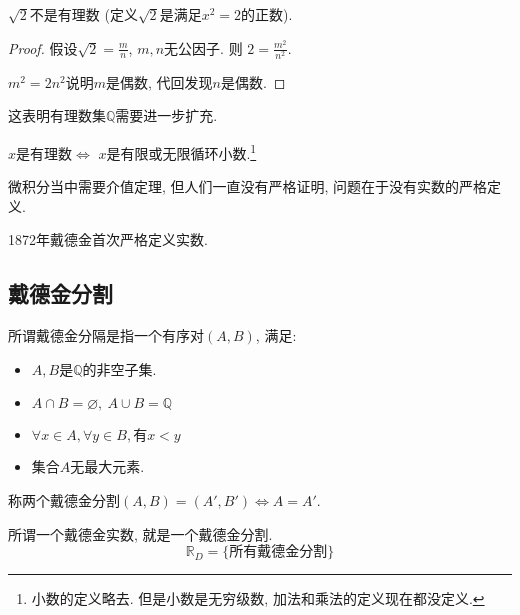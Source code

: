 \begin{proposition}
    $\sqrt{2}$不是有理数 (定义$\sqrt{2}$是满足$x^2 = 2$的正数).
\end{proposition}
\begin{proof}
    假设$\sqrt{2} = \frac{m}{n}$, $m,n$无公因子. 则 $2 = \frac{m^2}{n^2}.$

    $m^2 = 2 n^2$说明$m$是偶数, 代回发现$n$是偶数.
\end{proof}

这表明有理数集$\mathbb{Q}$需要进一步扩充.

\begin{proposition}
    $x$是有理数$\iff$ $x$是有限或无限循环小数.\footnote{小数的定义略去. 但是小数是无穷级数, 加法和乘法的定义现在都没定义.}
\end{proposition}

微积分当中需要介值定理, 但人们一直没有严格证明, 问题在于没有实数的严格定义.

1872年戴德金首次严格定义实数.

\subsection{戴德金分割}

\begin{definition}
    所谓戴德金分隔是指一个有序对$(A,B)$, 满足:
    \begin{itemize}
        \item $A,B$是$\mathbb{Q}$的非空子集.
        \item $A \cap B = \varnothing, \ A \cup B = \mathbb{Q}$
        \item $\forall x\in A, \forall y\in B, \text{有} x< y$
        \item 集合$A$无最大元素.
    \end{itemize}

    称两个戴德金分割$(A,B) = (A',B') \iff A = A'$.
\end{definition}

\begin{definition}
    所谓一个戴德金实数, 就是一个戴德金分割.
    \begin{equation}
      \mathbb{R}_{D} = \{\text{所有戴德金分割}\}
    \end{equation}
\end{definition}

